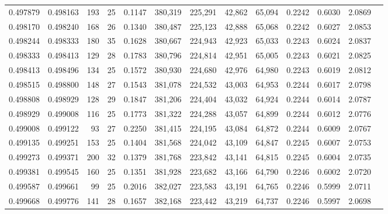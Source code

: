 \begin{tabular}{rrrrrrrrrrrrr}
0.497879 & 0.498163 &    193 &    25 &                                     0.1147 & 380,319 & 225,291 &  42,862 &  65,094 & 0.2242 & 0.6030 & 2.0869 \\
0.498170 & 0.498240 &    168 &    26 &                                     0.1340 & 380,487 & 225,123 &  42,888 &  65,068 & 0.2242 & 0.6027 & 2.0853 \\
0.498244 & 0.498333 &    180 &    35 &                                     0.1628 & 380,667 & 224,943 &  42,923 &  65,033 & 0.2243 & 0.6024 & 2.0837 \\
0.498333 & 0.498413 &    129 &    28 &                                     0.1783 & 380,796 & 224,814 &  42,951 &  65,005 & 0.2243 & 0.6021 & 2.0825 \\
0.498413 & 0.498496 &    134 &    25 &                                     0.1572 & 380,930 & 224,680 &  42,976 &  64,980 & 0.2243 & 0.6019 & 2.0812 \\
0.498515 & 0.498800 &    148 &    27 &                                     0.1543 & 381,078 & 224,532 &  43,003 &  64,953 & 0.2244 & 0.6017 & 2.0798 \\
0.498808 & 0.498929 &    128 &    29 &                                     0.1847 & 381,206 & 224,404 &  43,032 &  64,924 & 0.2244 & 0.6014 & 2.0787 \\
0.498929 & 0.499008 &    116 &    25 &                                     0.1773 & 381,322 & 224,288 &  43,057 &  64,899 & 0.2244 & 0.6012 & 2.0776 \\
0.499008 & 0.499122 &     93 &    27 &                                     0.2250 & 381,415 & 224,195 &  43,084 &  64,872 & 0.2244 & 0.6009 & 2.0767 \\
0.499135 & 0.499251 &    153 &    25 &                                     0.1404 & 381,568 & 224,042 &  43,109 &  64,847 & 0.2245 & 0.6007 & 2.0753 \\
0.499273 & 0.499371 &    200 &    32 &                                     0.1379 & 381,768 & 223,842 &  43,141 &  64,815 & 0.2245 & 0.6004 & 2.0735 \\
0.499381 & 0.499545 &    160 &    25 &                                     0.1351 & 381,928 & 223,682 &  43,166 &  64,790 & 0.2246 & 0.6002 & 2.0720 \\
0.499587 & 0.499661 &     99 &    25 &                                     0.2016 & 382,027 & 223,583 &  43,191 &  64,765 & 0.2246 & 0.5999 & 2.0711 \\
0.499668 & 0.499776 &    141 &    28 &                                     0.1657 & 382,168 & 223,442 &  43,219 &  64,737 & 0.2246 & 0.5997 & 2.0698 \\

\end{tabular}
